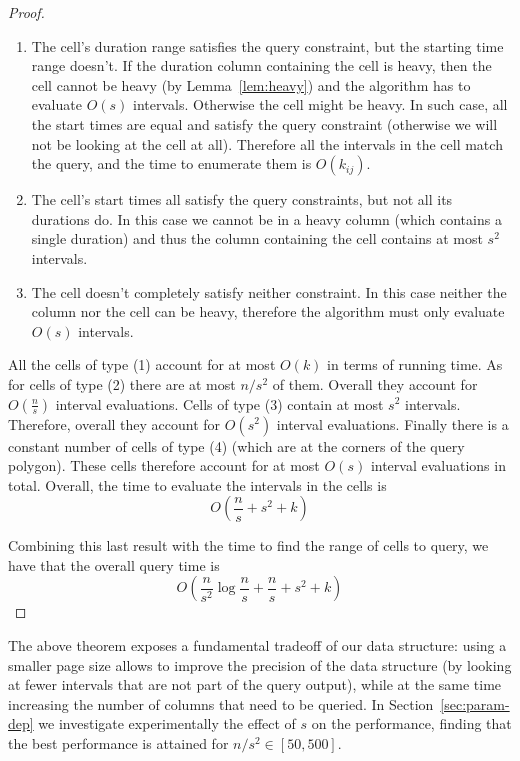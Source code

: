 \documentclass[sigconf,nonacm,anonymous]{acmart}
\theoremstyle{definition}
\newcommand{\BO}[1]{O\left(#1\right)}
\begin{document}
\begin{proof}
\begin{enumerate}
		\item The cell's duration range satisfies the query constraint, but
		the starting time range doesn't. If the duration column containing the
		cell is heavy, then the cell cannot be heavy (by
		Lemma~\ref{lem:heavy}) and the algorithm has to evaluate $\BO{s}$
		intervals. Otherwise the cell might be heavy. In such case, all the
		start times are equal and satisfy the query constraint (otherwise we
		will not be looking at the cell at all). Therefore all the intervals
		in the cell match the query, and the time to enumerate them is
		$\BO{k_{ij}}$.

		\item The cell's start times all satisfy the query constraints, but
		not all its durations do. In this case we cannot be in a heavy column
		(which contains a single duration) and thus the column containing the
		cell contains at most $s^2$ intervals.

		\item The cell doesn't completely satisfy neither constraint. In this
		case neither the column nor the cell can be heavy, therefore the
		algorithm must only evaluate $\BO{s}$ intervals.
	\end{enumerate}
	All the cells of type (1) account for at most $\BO{k}$ in terms of running time.
	As for cells of type (2) there are at most $n/s^2$ of them. Overall they account for $\BO{\frac{n}{s}}$ interval evaluations.
	Cells of type (3) contain at most $s^2$ intervals. Therefore, overall they account for $\BO{s^2}$ interval evaluations.
	Finally there is a constant number of cells of type (4) (which are at the corners of the query polygon).
	These cells therefore account for at most $\BO{s}$ interval evaluations in total.
	Overall, the time to evaluate the intervals in the cells is
	\[
		\BO{\frac{n}{s} + s^2 + k}
	\]

	Combining this last result with the time to find the range of cells to query, we have that the overall query time is
	\[
		\BO{\frac{n}{s^2}\log\frac{n}{s} + \frac{n}{s} + s^2 + k}
	\]
\end{proof}

The above theorem exposes a fundamental tradeoff of our data structure:
using a smaller page size allows to improve the precision of the data structure
(by looking at fewer intervals that are not part of the query output), while
at the same time increasing the number of columns that need to be queried.
In Section~\ref{sec:param-dep} we investigate experimentally the effect of $s$ on the performance, finding that the best performance is attained for $n/s^2 \in [50,500]$.
\end{document}
